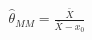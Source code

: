 \documentclass[preview]{standalone}
\begin{document}
\begin{align*}
\hat{\theta}_{MM} = \frac{\bar{X}}{\bar{X} - x_0}
\end{align*}
\end{document}
